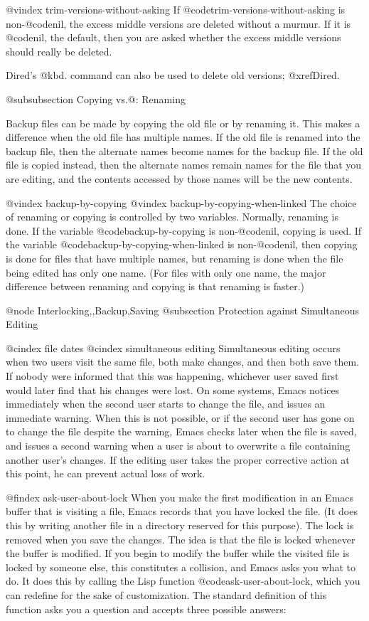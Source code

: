 {{{{{{{{{{{{{{{{{{{@vindex trim-versions-without-asking
  If @code{trim-versions-without-asking} is non-@code{nil}, the excess
middle versions are deleted without a murmur.  If it is @code{nil}, the
default, then you are asked whether the excess middle versions should
really be deleted.

  Dired's @kbd{.} command can also be used to delete old versions;
@xref{Dired}.

@subsubsection Copying vs.@: Renaming

  Backup files can be made by copying the old file or by renaming it.  This
makes a difference when the old file has multiple names.  If the old file
is renamed into the backup file, then the alternate names become names for
the backup file.  If the old file is copied instead, then the alternate
names remain names for the file that you are editing, and the contents
accessed by those names will be the new contents.

@vindex backup-by-copying
@vindex backup-by-copying-when-linked
  The choice of renaming or copying is controlled by two variables.
Normally, renaming is done.  If the variable @code{backup-by-copying} is
non-@code{nil}, copying is used.  If the variable @code{backup-by-copying-when-linked}
is non-@code{nil}, then copying is done for files that have multiple names,
but renaming is done when the file being edited has only one name.  (For
files with only one name, the major difference between renaming and copying
is that renaming is faster.)

@node Interlocking,,Backup,Saving
@subsection Protection against Simultaneous Editing

@cindex file dates
@cindex simultaneous editing
  Simultaneous editing occurs when two users visit the same file, both make
changes, and then both save them.  If nobody were informed that this was
happening, whichever user saved first would later find that his changes
were lost.  On some systems, Emacs notices immediately when the second user
starts to change the file, and issues an immediate warning.  When this is
not possible, or if the second user has gone on to change the file despite
the warning, Emacs checks later when the file is saved, and issues a second
warning when a user is about to overwrite a file containing another user's
changes.  If the editing user takes the proper corrective action at this
point, he can prevent actual loss of work.

@findex ask-user-about-lock
  When you make the first modification in an Emacs buffer that is visiting
a file, Emacs records that you have locked the file.  (It does this by
writing another file in a directory reserved for this purpose).  The lock
is removed when you save the changes.  The idea is that the file is locked
whenever the buffer is modified.  If you begin to modify the buffer while
the visited file is locked by someone else, this constitutes a collision,
and Emacs asks you what to do.  It does this by calling the Lisp function
@code{ask-user-about-lock}, which you can redefine for the sake of
customization.  The standard definition of this function asks you a
question and accepts three possible answers:

}}}}}}}}}}}}}}}}}}}
